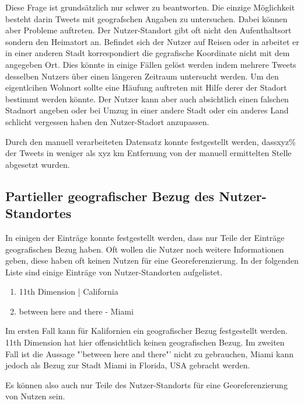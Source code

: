 			Diese Frage ist grundsätzlich nur schwer zu beantworten.
			Die einzige Möglichkeit besteht darin Tweets mit geografschen Angaben zu untersuchen.
			Dabei können aber Probleme auftreten. 
			Der Nutzer-Standort gibt oft nicht den Aufenthaltsort sondern den Heimatort an. 
			Befindet sich der Nutzer auf Reisen oder in arbeitet er in einer anderen Stadt korrespondiert die gegrafische Koordinate nicht mit dem angegeben Ort.
			Dies könnte in einige Fällen gelöst werden indem mehrere Tweets desselben Nutzers über einen längeren Zeitraum untersucht werden. 
			Um den eigentlcihen Wohnort sollte eine Häufung auftreten mit Hilfe derer der Stadort bestimmt werden könnte.
			Der Nutzer kann aber auch absichtlich einen falschen Stadnort angeben oder bei Umzug in einer andere Stadt oder ein anderes Land schlicht vergessen haben den Nutzer-Stadort anzupassen.

			Durch den manuell verarbeiteten Datensatz konnte festgestellt werden, dassxyz\% der Tweets in weniger als xyz km Entfernung von der manuell ermittelten Stelle abgesetzt wurden.


		\subsection{Partieller geografischer Bezug des Nutzer-Standortes} \label{subsec:partiellerGeografischerBezug} 

			In einigen der Einträge konnte festgestellt werden, dass nur Teile der Einträge geografischen Bezug haben. 
			Oft wollen die Nutzer noch weitere Informationen geben, diese haben oft keinen Nutzen für eine Georeferenzierung. 
			In der folgenden Liste sind einige Einträge von Nutzer-Standorten aufgelistet. 

			\begin{enumerate}
				\item 11th Dimension | California
				\item between here and there - Miami
			\end{enumerate}

			Im ersten Fall kann für Kalifornien ein geografischer Bezug festgestellt werden.
			11th Dimension hat hier offensichtlich keinen geografischen Bezug.
			Im zweiten Fall ist die Aussage "'between here and there"' nicht zu gebrauchen, Miami kann jedoch als Bezug zur Stadt Miami in Florida, USA gebracht werden.
			
			Es können also auch nur Teile des Nutzer-Standorts für eine Georeferenzierung von Nutzen sein.


